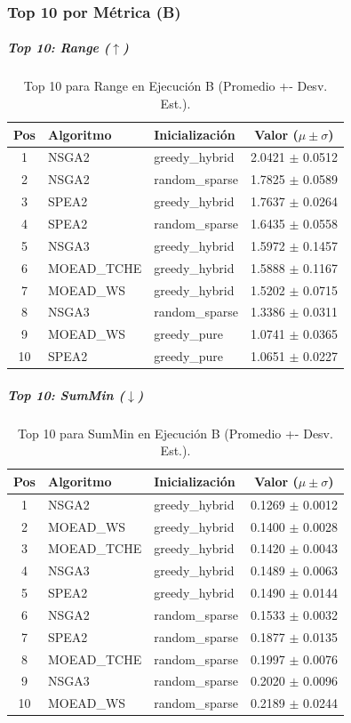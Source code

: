 \documentclass[a4paper,10pt]{article}
\begin{document}
\subsubsection{Top 10 por Métrica (B)}
\subparagraph{Top 10: Range ($\uparrow$)}
\begin{table}[H]
    \centering
    \begin{tabular}{cllc}
        \toprule
        Pos & Algoritmo & Inicialización & Valor ($\mu \pm \sigma$) \\
        \midrule
        1 & NSGA2 & greedy\_hybrid & 2.0421 $\pm$ 0.0512 \\
        2 & NSGA2 & random\_sparse & 1.7825 $\pm$ 0.0589 \\
        3 & SPEA2 & greedy\_hybrid & 1.7637 $\pm$ 0.0264 \\
        4 & SPEA2 & random\_sparse & 1.6435 $\pm$ 0.0558 \\
        5 & NSGA3 & greedy\_hybrid & 1.5972 $\pm$ 0.1457 \\
        6 & MOEAD\_TCHE & greedy\_hybrid & 1.5888 $\pm$ 0.1167 \\
        7 & MOEAD\_WS & greedy\_hybrid & 1.5202 $\pm$ 0.0715 \\
        8 & NSGA3 & random\_sparse & 1.3386 $\pm$ 0.0311 \\
        9 & MOEAD\_WS & greedy\_pure & 1.0741 $\pm$ 0.0365 \\
        10 & SPEA2 & greedy\_pure & 1.0651 $\pm$ 0.0227 \\
        \bottomrule
    \end{tabular}
    \caption{Top 10 para Range en Ejecución B (Promedio +- Desv. Est.).}
\end{table}

\subparagraph{Top 10: SumMin ($\downarrow$)}
\begin{table}[H]
    \centering
    \begin{tabular}{cllc}
        \toprule
        Pos & Algoritmo & Inicialización & Valor ($\mu \pm \sigma$) \\
        \midrule
        1 & NSGA2 & greedy\_hybrid & 0.1269 $\pm$ 0.0012 \\
        2 & MOEAD\_WS & greedy\_hybrid & 0.1400 $\pm$ 0.0028 \\
        3 & MOEAD\_TCHE & greedy\_hybrid & 0.1420 $\pm$ 0.0043 \\
        4 & NSGA3 & greedy\_hybrid & 0.1489 $\pm$ 0.0063 \\
        5 & SPEA2 & greedy\_hybrid & 0.1490 $\pm$ 0.0144 \\
        6 & NSGA2 & random\_sparse & 0.1533 $\pm$ 0.0032 \\
        7 & SPEA2 & random\_sparse & 0.1877 $\pm$ 0.0135 \\
        8 & MOEAD\_TCHE & random\_sparse & 0.1997 $\pm$ 0.0076 \\
        9 & NSGA3 & random\_sparse & 0.2020 $\pm$ 0.0096 \\
        10 & MOEAD\_WS & random\_sparse & 0.2189 $\pm$ 0.0244 \\
        \bottomrule
    \end{tabular}
    \caption{Top 10 para SumMin en Ejecución B (Promedio +- Desv. Est.).}
\end{table}
\end{document}
